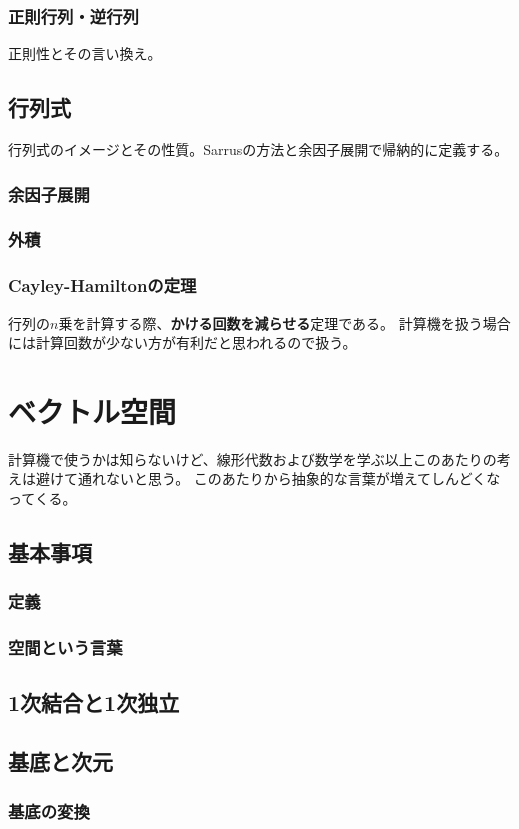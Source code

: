 \documentclass[10pt]{jsarticle}
\theoremstyle{definition}%
\numberwithin{equation}{section}%
\begin{document}
\subsubsection{正則行列・逆行列}
正則性とその言い換え。
\subsection{行列式}
行列式のイメージとその性質。Sarrusの方法と余因子展開で帰納的に定義する。
\subsubsection{余因子展開}
\subsubsection{外積}
\subsubsection{Cayley-Hamiltonの定理}
行列の$n$乗を計算する際、{\bf かける回数を減らせる}定理である。
計算機を扱う場合には計算回数が少ない方が有利だと思われるので扱う。
\section{ベクトル空間}
計算機で使うかは知らないけど、線形代数および数学を学ぶ以上このあたりの考えは避けて通れないと思う。
このあたりから抽象的な言葉が増えてしんどくなってくる。
\subsection{基本事項}
\subsubsection{定義}
\subsubsection{空間という言葉}
\subsection{1次結合と1次独立}
\subsection{基底と次元}
\subsubsection{基底の変換}
\end{document}
